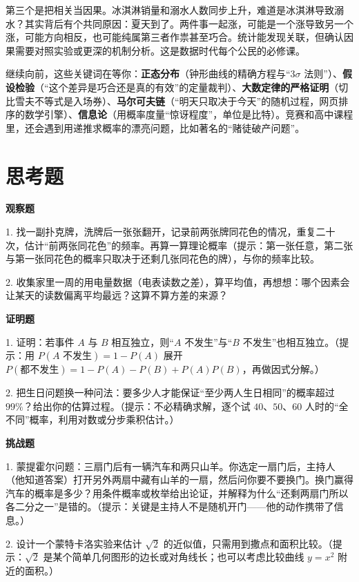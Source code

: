 第三个是把相关当因果。冰淇淋销量和溺水人数同步上升，难道是冰淇淋导致溺水？其实背后有个共同原因：夏天到了。两件事一起涨，可能是一个涨导致另一个涨，可能方向相反，也可能纯属第三者作祟甚至巧合。统计能发现关联，但确认因果需要对照实验或更深的机制分析。这是数据时代每个公民的必修课。

\begin{pandeng}
继续向前，这些关键词在等你：\textbf{正态分布}（钟形曲线的精确方程与“$3\sigma$ 法则”）、\textbf{假设检验}（“这个差异是巧合还是真的有效”的定量裁判）、\textbf{大数定律的严格证明}（切比雪夫不等式是入场券）、\textbf{马尔可夫链}（“明天只取决于今天”的随机过程，网页排序的数学引擎）、\textbf{信息论}（用概率度量“惊讶程度”，单位是比特）。竞赛和高中课程里，还会遇到用递推求概率的漂亮问题，比如著名的“赌徒破产问题”。
\end{pandeng}

\section*{思考题}

\textbf{观察题}

1. 找一副扑克牌，洗牌后一张张翻开，记录前两张牌同花色的情况，重复二十次，估计“前两张同花色”的频率。再算一算理论概率（提示：第一张任意，第二张与第一张同花色的概率只取决于还剩几张同花色的牌），与你的频率比较。

2. 收集家里一周的用电量数据（电表读数之差），算平均值，再想想：哪个因素会让某天的读数偏离平均最远？这算不算方差的来源？

\textbf{证明题}

1. 证明：若事件 $A$ 与 $B$ 相互独立，则“$A$ 不发生”与“$B$ 不发生”也相互独立。（提示：用 $P(A\text{ 不发生})=1-P(A)$ 展开 $P(\text{都不发生})=1-P(A)-P(B)+P(A)P(B)$，再做因式分解。）

2. 把生日问题换一种问法：要多少人才能保证“至少两人生日相同”的概率超过 $99\%$？给出你的估算过程。（提示：不必精确求解，逐个试 $40$、$50$、$60$ 人时的“全不同”概率，利用对数或分步乘积估计。）

\textbf{挑战题}

1. 蒙提霍尔问题：三扇门后有一辆汽车和两只山羊。你选定一扇门后，主持人（他知道答案）打开另外两扇中藏有山羊的一扇，然后问你要不要换门。换门赢得汽车的概率是多少？用条件概率或枚举给出论证，并解释为什么“还剩两扇门所以各二分之一”是错的。（提示：关键是主持人不是随机开门——他的动作携带了信息。）

2. 设计一个蒙特卡洛实验来估计 $\sqrt{2}$ 的近似值，只需用到撒点和面积比较。（提示：$\sqrt{2}$ 是某个简单几何图形的边长或对角线长；也可以考虑比较曲线 $y=x^2$ 附近的面积。）

